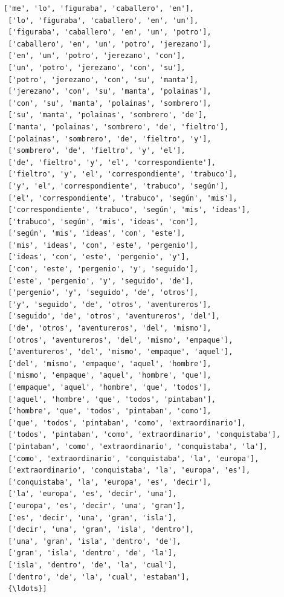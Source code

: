\documentclass[11pt]{article}
\begin{document}
\begin{tcolorbox}[breakable, size=fbox, boxrule=1pt, pad at break*=1mm,colback=cellbackground, colframe=cellborder]
\begin{Verbatim}[commandchars=\\\{\}]
 ['me', 'lo', 'figuraba', 'caballero', 'en'],
 ['lo', 'figuraba', 'caballero', 'en', 'un'],
 ['figuraba', 'caballero', 'en', 'un', 'potro'],
 ['caballero', 'en', 'un', 'potro', 'jerezano'],
 ['en', 'un', 'potro', 'jerezano', 'con'],
 ['un', 'potro', 'jerezano', 'con', 'su'],
 ['potro', 'jerezano', 'con', 'su', 'manta'],
 ['jerezano', 'con', 'su', 'manta', 'polainas'],
 ['con', 'su', 'manta', 'polainas', 'sombrero'],
 ['su', 'manta', 'polainas', 'sombrero', 'de'],
 ['manta', 'polainas', 'sombrero', 'de', 'fieltro'],
 ['polainas', 'sombrero', 'de', 'fieltro', 'y'],
 ['sombrero', 'de', 'fieltro', 'y', 'el'],
 ['de', 'fieltro', 'y', 'el', 'correspondiente'],
 ['fieltro', 'y', 'el', 'correspondiente', 'trabuco'],
 ['y', 'el', 'correspondiente', 'trabuco', 'según'],
 ['el', 'correspondiente', 'trabuco', 'según', 'mis'],
 ['correspondiente', 'trabuco', 'según', 'mis', 'ideas'],
 ['trabuco', 'según', 'mis', 'ideas', 'con'],
 ['según', 'mis', 'ideas', 'con', 'este'],
 ['mis', 'ideas', 'con', 'este', 'pergenio'],
 ['ideas', 'con', 'este', 'pergenio', 'y'],
 ['con', 'este', 'pergenio', 'y', 'seguido'],
 ['este', 'pergenio', 'y', 'seguido', 'de'],
 ['pergenio', 'y', 'seguido', 'de', 'otros'],
 ['y', 'seguido', 'de', 'otros', 'aventureros'],
 ['seguido', 'de', 'otros', 'aventureros', 'del'],
 ['de', 'otros', 'aventureros', 'del', 'mismo'],
 ['otros', 'aventureros', 'del', 'mismo', 'empaque'],
 ['aventureros', 'del', 'mismo', 'empaque', 'aquel'],
 ['del', 'mismo', 'empaque', 'aquel', 'hombre'],
 ['mismo', 'empaque', 'aquel', 'hombre', 'que'],
 ['empaque', 'aquel', 'hombre', 'que', 'todos'],
 ['aquel', 'hombre', 'que', 'todos', 'pintaban'],
 ['hombre', 'que', 'todos', 'pintaban', 'como'],
 ['que', 'todos', 'pintaban', 'como', 'extraordinario'],
 ['todos', 'pintaban', 'como', 'extraordinario', 'conquistaba'],
 ['pintaban', 'como', 'extraordinario', 'conquistaba', 'la'],
 ['como', 'extraordinario', 'conquistaba', 'la', 'europa'],
 ['extraordinario', 'conquistaba', 'la', 'europa', 'es'],
 ['conquistaba', 'la', 'europa', 'es', 'decir'],
 ['la', 'europa', 'es', 'decir', 'una'],
 ['europa', 'es', 'decir', 'una', 'gran'],
 ['es', 'decir', 'una', 'gran', 'isla'],
 ['decir', 'una', 'gran', 'isla', 'dentro'],
 ['una', 'gran', 'isla', 'dentro', 'de'],
 ['gran', 'isla', 'dentro', 'de', 'la'],
 ['isla', 'dentro', 'de', 'la', 'cual'],
 ['dentro', 'de', 'la', 'cual', 'estaban'],
 {\ldots}]
\end{Verbatim}
\end{tcolorbox}
        
\end{document}
